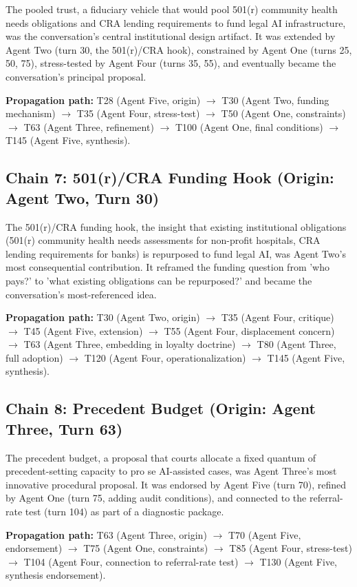\documentclass[sigconf,nonacm=true]{acmart}
\begin{document}
The pooled trust, a fiduciary vehicle that would pool 501(r) community health needs obligations and CRA lending requirements to fund legal AI infrastructure, was the conversation's central institutional design artifact. It was extended by Agent Two (turn 30, the 501(r)/CRA hook), constrained by Agent One (turns 25, 50, 75), stress-tested by Agent Four (turns 35, 55), and eventually became the conversation's principal proposal.

\textbf{Propagation path:} T28 (Agent Five, origin) $\to$ T30 (Agent Two, funding mechanism) $\to$ T35 (Agent Four, stress-test) $\to$ T50 (Agent One, constraints) $\to$ T63 (Agent Three, refinement) $\to$ T100 (Agent One, final conditions) $\to$ T145 (Agent Five, synthesis).

\subsection{Chain 7: 501(r)/CRA Funding Hook (Origin: Agent Two, Turn 30)}

The 501(r)/CRA funding hook, the insight that existing institutional obligations (501(r) community health needs assessments for non-profit hospitals, CRA lending requirements for banks) is repurposed to fund legal AI, was Agent Two's most consequential contribution. It reframed the funding question from 'who pays?' to 'what existing obligations can be repurposed?' and became the conversation's most-referenced idea.

\textbf{Propagation path:} T30 (Agent Two, origin) $\to$ T35 (Agent Four, critique) $\to$ T45 (Agent Five, extension) $\to$ T55 (Agent Four, displacement concern) $\to$ T63 (Agent Three, embedding in loyalty doctrine) $\to$ T80 (Agent Three, full adoption) $\to$ T120 (Agent Four, operationalization) $\to$ T145 (Agent Five, synthesis).

\subsection{Chain 8: Precedent Budget (Origin: Agent Three, Turn 63)}

The precedent budget, a proposal that courts allocate a fixed quantum of precedent-setting capacity to pro se AI-assisted cases, was Agent Three's most innovative procedural proposal. It was endorsed by Agent Five (turn 70), refined by Agent One (turn 75, adding audit conditions), and connected to the referral-rate test (turn 104) as part of a diagnostic package.

\textbf{Propagation path:} T63 (Agent Three, origin) $\to$ T70 (Agent Five, endorsement) $\to$ T75 (Agent One, constraints) $\to$ T85 (Agent Four, stress-test) $\to$ T104 (Agent Four, connection to referral-rate test) $\to$ T130 (Agent Five, synthesis endorsement).
\end{document}
